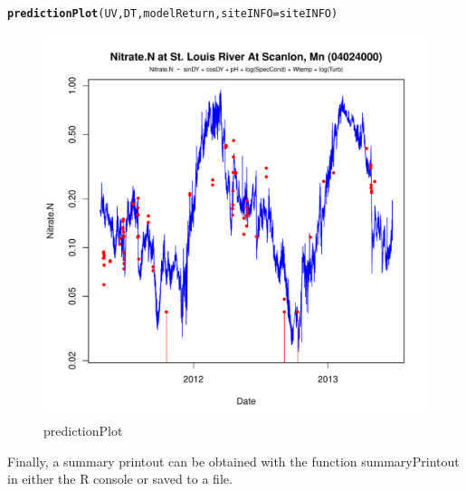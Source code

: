 \documentclass[a4paper,11pt]{article}\usepackage[]{graphicx}\usepackage[]{color}
\makeatletter
\def\maxwidth{ %
  \ifdim\Gin@nat@width>\linewidth
    \linewidth
  \else
    \Gin@nat@width
  \fi
}
\newcommand{\hlstd}[1]{\textcolor[rgb]{0.345,0.345,0.345}{#1}}%
\newcommand{\hlkwc}[1]{\textcolor[rgb]{0.333,0.667,0.333}{#1}}%
\newcommand{\hlkwd}[1]{\textcolor[rgb]{0.737,0.353,0.396}{\textbf{#1}}}%
\newenvironment{kframe}{%
 \def\at@end@of@kframe{}%
 \ifinner\ifhmode%
  \def\at@end@of@kframe{\end{minipage}}%
  \begin{minipage}{\columnwidth}%
 \fi\fi%
 \def\FrameCommand##1{\hskip\@totalleftmargin \hskip-\fboxsep
 \colorbox{shadecolor}{##1}\hskip-\fboxsep
     \hskip-\linewidth \hskip-\@totalleftmargin \hskip\columnwidth}%
 \MakeFramed {\advance\hsize-\width
   \@totalleftmargin\z@ \linewidth\hsize
   \@setminipage}}%
 {\par\unskip\endMakeFramed%
 \at@end@of@kframe}
\newenvironment{knitrout}{}{} %
\makeatother
\begin{document}
\begin{knitrout}
\color{fgcolor}\begin{kframe}
\begin{alltt}
\hlkwd{predictionPlot}\hlstd{(UV,DT,modelReturn,}\hlkwc{siteINFO}\hlstd{=siteINFO)}
\end{alltt}
\end{kframe}\begin{figure}[]

\includegraphics[width=\maxwidth]{figure/predictionPlot} \caption[predictionPlot]{predictionPlot\label{fig:predictionPlot}}
\end{figure}


\end{knitrout}


\FloatBarrier
Finally, a summary printout can be obtained with the function summaryPrintout in either the R console or saved to a file.
\end{document}
